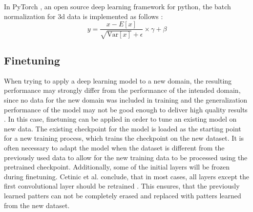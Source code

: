 In PyTorch \cite{PyTorch}, an open source  deep learning framework for python,  the batch normalization for 3d data is implemented as follows \cite{BatchNorm3dPyTorchDocumentation}:
$$ y = \dfrac{x-E\left[ x\right]}{\sqrt{\text{Var}\left[ x\right]} + \epsilon} \times \gamma + \beta $$
\subsection{Finetuning}
When trying to apply a deep learning model to a new domain, the resulting performance may strongly differ from the performance of the intended domain, since no data for the new domain was included in training and the generalization performance of the model may not be good enough to deliver high quality results \cite{cetinicFinetuningConvolutionalNeural2018}.
In this case, finetuning can be applied in order to tune an existing model on new data.
The existing checkpoint for the model is loaded as the starting point for a new training process, which trains the checkpoint on the new dataset.
It is often necessary to adapt the model when the dataset is different from the previously used data to allow for the new training data to be processed using the pretrained checkpoint.
Additionally, some of the initial layers will be frozen during  finetuning. Cetinic et al. conclude, that in most cases, all layers except the first convolutional layer should be retrained \cite{cetinicFinetuningConvolutionalNeural2018}. This ensures, that the previously learned patters can not be completely erased and replaced with patters learned from the new dataset.
